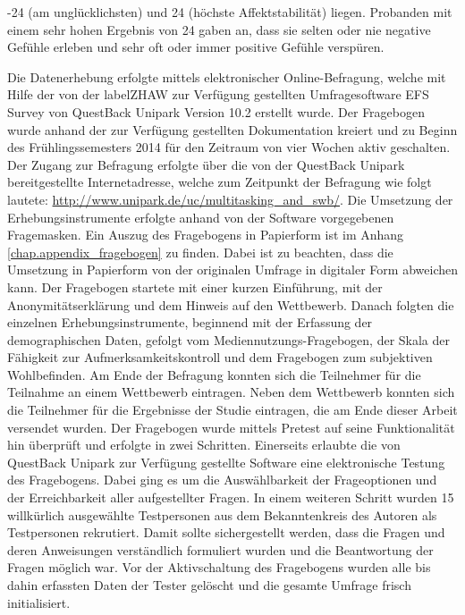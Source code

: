 -24 (am unglücklichsten) und 24 (höchste Affektstabilität) liegen. Probanden mit einem sehr hohen Ergebnis von 24 gaben an, dass sie selten oder nie negative Gefühle erleben und sehr oft oder immer positive Gefühle verspüren.

\label{section.datenerhebung}
Die Datenerhebung erfolgte mittels elektronischer Online-Befragung, welche mit Hilfe der von der \gls{labelZHAW} zur Verfügung gestellten Umfragesoftware EFS Survey von QuestBack Unipark Version 10.2 erstellt wurde. Der Fragebogen wurde anhand der zur Verfügung gestellten Dokumentation kreiert \cite{QuestBack2014} und zu Beginn des Frühlingssemesters 2014 für den Zeitraum von vier Wochen aktiv geschalten. Der Zugang zur Befragung erfolgte über die von der QuestBack Unipark bereitgestellte Internetadresse, welche zum Zeitpunkt der Befragung wie folgt lautete: \url{http://www.unipark.de/uc/multitasking_and_swb/}. Die Umsetzung der Erhebungsinstrumente erfolgte anhand von der Software vorgegebenen Fragemasken. Ein Auszug des Fragebogens in Papierform ist im Anhang \ref{chap.appendix_fragebogen} zu finden. Dabei ist zu beachten, dass die Umsetzung in Papierform von der originalen Umfrage in digitaler Form abweichen kann. Der Fragebogen startete mit einer kurzen Einführung, mit der Anonymitätserklärung und dem Hinweis auf den Wettbewerb. Danach folgten die einzelnen Erhebungsinstrumente, beginnend mit der Erfassung der demographischen Daten, gefolgt vom Mediennutzungs-Fragebogen, der Skala der Fähigkeit zur Aufmerksamkeitskontroll und dem Fragebogen zum subjektiven Wohlbefinden. Am Ende der Befragung konnten sich die Teilnehmer für die Teilnahme an einem Wettbewerb eintragen. Neben dem Wettbewerb konnten sich die Teilnehmer für die Ergebnisse der Studie eintragen, die am Ende dieser Arbeit versendet wurden. Der Fragebogen wurde mittels Pretest auf seine Funktionalität hin überprüft und erfolgte in zwei Schritten. Einerseits erlaubte die von QuestBack Unipark zur Verfügung gestellte Software eine elektronische Testung des Fragebogens. Dabei ging es um die Auswählbarkeit der Frageoptionen und der Erreichbarkeit aller aufgestellter Fragen. In einem weiteren Schritt wurden 15 willkürlich ausgewählte Testpersonen aus dem Bekanntenkreis des Autoren als Testpersonen rekrutiert. Damit sollte sichergestellt werden, dass die Fragen und deren Anweisungen verständlich formuliert wurden und die Beantwortung der Fragen möglich war. Vor der Aktivschaltung des Fragebogens wurden alle bis dahin erfassten Daten der Tester gelöscht und die gesamte Umfrage frisch initialisiert. 

